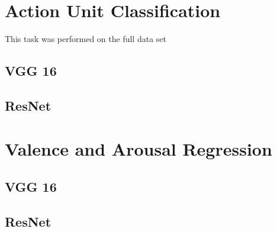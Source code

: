 \documentclass[12pt,twoside]{article}
\begin{document}
\section{Action Unit Classification}

This task was performed on the full data set

\subsection{VGG 16}

\subsection{ResNet}

\section{Valence and Arousal Regression}

\subsection{VGG 16}

\subsection{ResNet}








\clearpage



\appendix
\end{document}
